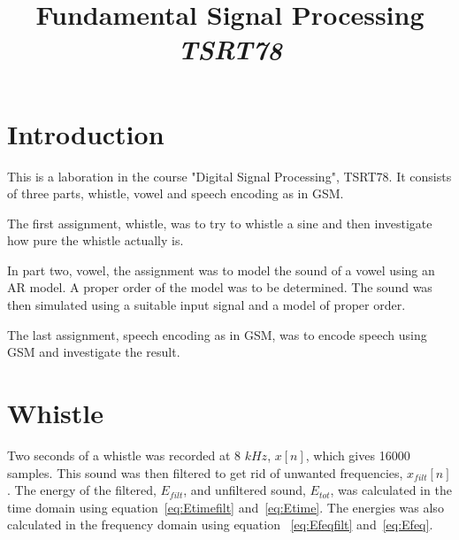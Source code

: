\documentclass[10pt]{article}
\title{Fundamental Signal Processing\\
\emph{TSRT78}}
\begin{document}


\maketitle

\newpage
\tableofcontents
\newpage

\section{Introduction}
This is a laboration in the course "Digital Signal Processing", TSRT78.
It consists of three parts, whistle, vowel and speech encoding as in GSM.

The first assignment, whistle, was to try to whistle a sine and then
investigate how pure the whistle actually is.

In part two, vowel, the assignment was to model the sound of a vowel
using an AR model. A proper order of the model was to be determined.
The sound was then simulated using a suitable input signal and a
model of proper order.

The last assignment, speech encoding as in GSM, was to encode speech
using GSM and investigate the result.

\section{Whistle}
Two seconds of a whistle was recorded at 8 $kHz$, $x[n]$, which gives 16000 samples.
This sound was then filtered to get rid of unwanted frequencies, $x_{filt}[n]$.
The energy of the filtered, $E_{filt}$, and unfiltered sound, $E_{tot}$,
was calculated in the time domain using equation~\ref{eq:Etimefilt}
and~\ref{eq:Etime}. The energies was also calculated in the frequency
domain using equation ~\ref{eq:Efeqfilt} and~\ref{eq:Efeq}.
\end{document}
